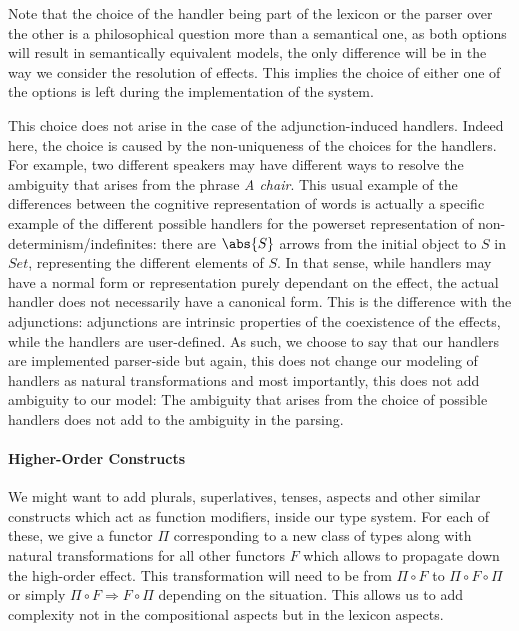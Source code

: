 \medskip

Note that the choice of the handler being part of the lexicon or the parser
over the other is a philosophical question more than a semantical one, as both
options will result in semantically equivalent models, the only difference will
be in the way we consider the resolution of effects.
This implies the choice of either one of the options is left during the
implementation of the system.

This choice does not arise in the case of the adjunction-induced
handlers.
Indeed here, the choice is caused by the non-uniqueness of the choices for
the handlers.
For example, two different speakers may have different ways to resolve the
ambiguity that arises from the phrase \textsl{A chair}.
This usual example of the differences between the cognitive representation of
words is actually a specific example of the different possible handlers for the
powerset representation of non-determinism/indefinites:
there are $\abs{S}$ arrows from the initial object to $S$ in $\mathit{Set}$,
representing the different elements of $S$.
In that sense, while handlers may have a normal form or representation purely
dependant on the effect, the actual handler does not necessarily have
a canonical form.
This is the difference with the adjunctions: adjunctions are intrinsic
properties of the coexistence of the effects, while the handlers are
user-defined.
As such, we choose to say that our handlers are implemented parser-side but
again, this does not change our modeling of handlers as natural
transformations and most importantly, this does not add ambiguity to our
model: The ambiguity that arises from the choice of possible handlers
does not add to the ambiguity in the parsing.

\paragraph{Higher-Order Constructs}
\label{par:higherorder}
We might want to add plurals, superlatives, tenses, aspects and other similar
constructs which act as function modifiers, inside our type system.
For each of these, we give a functor $\Pi$ corresponding to a new class of
types along with natural transformations for all other functors $F$ which
allows to propagate down the high-order effect.
This transformation will need to be from $\Pi \circ F$ to
$\Pi \circ F \circ \Pi$ or simply $\Pi \circ F \Rightarrow F \circ \Pi$
depending on the situation.
This allows us to add complexity not in the compositional aspects but
in the lexicon aspects.

